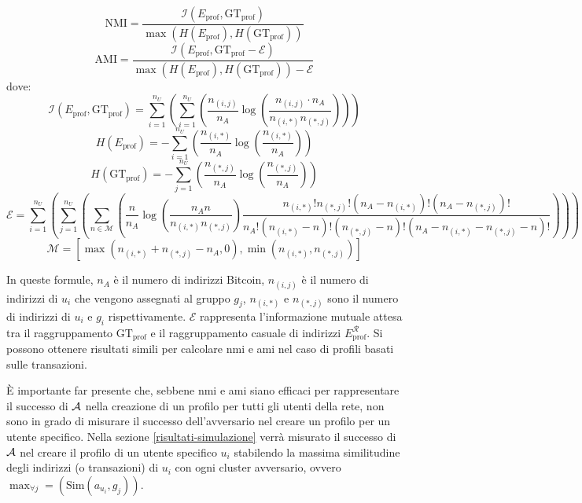 \[\text{NMI} = \frac{\mathcal{I} \left(E_\text{prof}, \text{GT}_\text{prof}\right)}{\max \left(H \left(E_\text{prof}\right),H \left(\text{GT}_\text{prof}\right)\right)} \]
\[\text{AMI} = \frac{\mathcal{I} \left(E_\text{prof}, \text{GT}_\text{prof} - \mathcal{E}\right)}{\max \left(H \left(E_\text{prof}\right),H \left(\text{GT}_\text{prof}\right)\right) - \mathcal{E}}\]
dove:
\[ \mathcal{I} \left(E_\text{prof}, \text{GT}_\text{prof}\right) = \sum^{n_U}_{i=1} \left( \sum^{n_U}_{i=1} \left( \frac{n_{\left(i,j \right)}}{n_A} \log\left(\frac{n_{\left(i,j\right)} \cdot n_A}{n_{\left(i,*\right)}n_{\left(*,j\right)}}\right)\right)\right) \]
\[ H\left(E_\text{prof}\right) = - \sum^{n_U}_{i=1} \left(\frac{n_{\left(i,*\right)}}{n_A} \log\left(\frac{n_{\left(i,*\right)}}{n_A}\right)\right) \]
\[ H\left(\text{GT}_\text{prof}\right) = - \sum^{n_U}_{j=1} \left(\frac{n_{\left(*,j\right)}}{n_A} \log\left(\frac{n_{\left(*,j\right)}}{n_A}\right)\right) \]
\[
	\scriptstyle \mathcal{E} = \sum^{n_U}_{i=1} \left(
	    \sum^{n_U}_{j=1} \left(
	        \sum_{n \in \mathcal{M}} \left(
	            \frac{n}{n_A} \log \left(
	                \frac{n_A n}{n_{\left(i, *\right)} n_{\left(*, j \right)}}
	            \right) \frac{n_{\left(i, *\right)}! n_{\left(*, j\right)}! \left(
	                n_A - n_{\left(i, *\right)}
	            \right)!\left(
	                n_A - n_{\left(*, j\right)}
	            \right)!}
	            {n_A!\left(n_{\left(i, *\right)} - n\right)!
	                    \left(n_{\left(*, j\right)} - n\right)!
	                    \left(n_A - n_{\left(i, *\right)} - n_{\left(*, j\right)} - n \right)!}
	            \right)
	        \right)
	    \right)
\]
\[ \mathcal{M} = \left[ \max \left( n_{\left(i,*\right)} + n_{\left(*,j\right)} - n_A, 0\right), \min\left(n_{\left(i,*\right)}, n_{\left(*,j\right)}\right)\right] \]

In queste formule, $n_A$ è il numero di indirizzi Bitcoin, $n_{\left(i,j\right)}$ è il numero di indirizzi di $u_i$ che vengono assegnati al gruppo $g_j$, $n_{\left(i,*\right)}$ e $n_{\left(*,j\right)}$ sono il numero di indirizzi di $u_i$ e $g_i$ rispettivamente. $\mathcal{E}$ rappresenta l'informazione mutuale attesa tra il raggruppamento $\text{GT}_\text{prof}$ e il raggruppamento casuale di indirizzi $E^\mathcal{R}_\text{prof}$.
Si possono ottenere risultati simili per calcolare \gls{nmi} e \gls{ami} nel caso di profili basati sulle transazioni.

È importante far presente che, sebbene \gls{nmi} e \gls{ami} siano efficaci per rappresentare il successo di $\mathcal{A}$ nella creazione di un profilo per tutti gli utenti della rete, non sono in grado di misurare il successo dell'avversario nel creare un profilo per un utente specifico.
Nella sezione \ref{risultati-simulazione} verrà misurato il successo di $\mathcal{A}$ nel creare il profilo di un utente specifico $u_i$ stabilendo la massima similitudine degli indirizzi (o transazioni) di $u_i$ con ogni cluster avversario, ovvero $ \max_{\forall j} = \left( \text{Sim}\left(a_{u_i}, g_j\right)\right)$.

